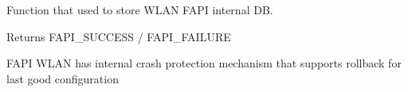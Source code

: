 Function that used to store W\-L\-A\-N F\-A\-P\-I internal D\-B. 

\begin{DoxyReturn}{Returns}
F\-A\-P\-I\-\_\-\-S\-U\-C\-C\-E\-S\-S / F\-A\-P\-I\-\_\-\-F\-A\-I\-L\-U\-R\-E
\end{DoxyReturn}
F\-A\-P\-I W\-L\-A\-N has internal crash protection mechanism that supports rollback for last good configuration 